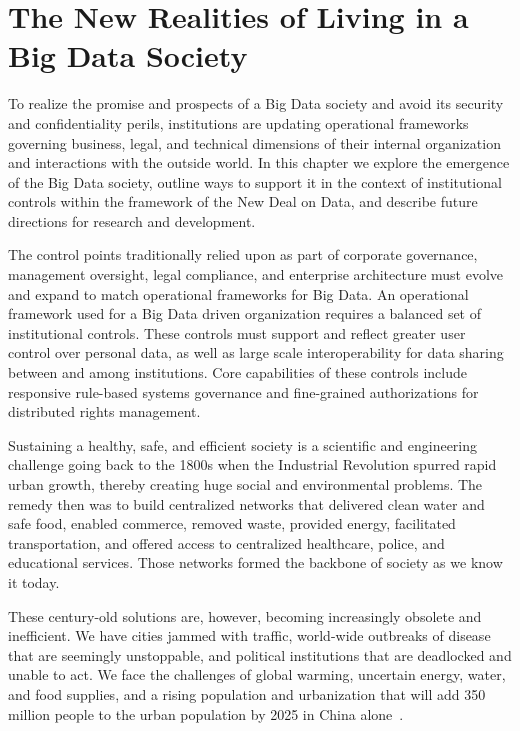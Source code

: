 \section{The New Realities of Living in a Big Data Society }

To realize the promise and prospects of a Big Data society and avoid its security and confidentiality perils, institutions are updating operational frameworks governing business, legal, and technical dimensions of their internal organization and interactions with the outside world.
In this chapter we explore the emergence of the Big Data society, outline ways to support it in the context of institutional controls within the framework of the New Deal on Data, and describe future directions for research and development.

The control points traditionally relied upon as part of corporate governance, management oversight, legal compliance, and enterprise architecture must evolve and expand to match operational frameworks for Big Data.
An operational framework used for a Big Data driven organization requires a balanced set of institutional controls.
These controls must support and reflect greater user control over personal data, as well as large scale interoperability for data sharing between and among institutions.
Core capabilities of these controls include responsive rule-based systems governance and fine-grained authorizations for distributed rights management.

Sustaining a healthy, safe, and efficient society is a scientific and engineering challenge going back to the 1800s when the Industrial Revolution spurred rapid urban growth, thereby creating huge social and environmental problems.
The remedy then was to build centralized networks that delivered clean water and safe food, enabled commerce, removed waste, provided energy, facilitated transportation, and offered access to centralized healthcare, police, and educational services.
Those networks formed the backbone of society as we know it today.

These century-old solutions are, however, becoming increasingly obsolete and inefficient.
We have cities jammed with traffic, world-wide outbreaks of disease that are seemingly unstoppable, and political institutions that are deadlocked and unable to act.
We face the challenges of global warming, uncertain energy, water, and food supplies, and a rising population and urbanization that will add 350 million people to the urban population by 2025 in China alone~\cite{cities2009}.


